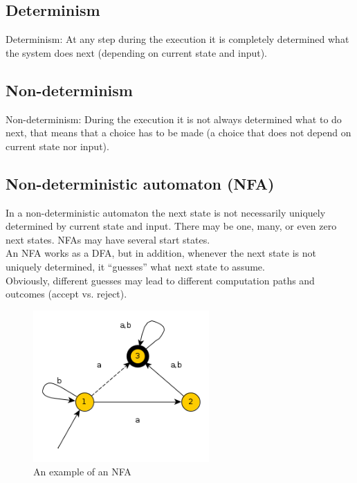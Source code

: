\documentclass[a4paper]{article}
\begin{document}
\subsection{Determinism}
Determinism: At any step during the execution it is completely determined
what the system does next (depending on current state and input).
\subsection{Non-determinism}
Non-determinism: During the execution it is not always determined what to do
next, that means that a choice has to be made (a choice that does not depend
on current state nor input).
\subsection{Non-deterministic automaton (NFA)}
In a non-deterministic automaton the next state is not necessarily uniquely
determined by current state and input. There may be one, many, or even zero
next states. NFAs may have several start states.
\\An NFA works as a DFA, but in addition, whenever the next state is not uniquely
determined, it ``guesses'' what next state to assume.
\\Obviously, different guesses may lead to different computation paths and outcomes
(accept vs. reject).
\begin{figure}[H]
    \centering
    \includegraphics[width=0.6\textwidth]{nfa.png}
    \caption{An example of an NFA}
\end{figure}
\end{document}
